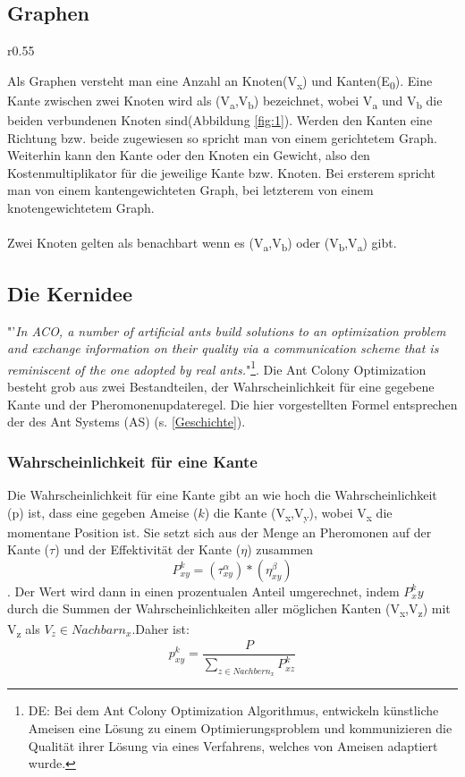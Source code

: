 \documentclass[12pt]{article}
\begin{document}
\subsection{Graphen}
\begin{wrapfigure}{r}{0.55\textwidth}
\centering
{}
\caption{Einfacher Graph}
\label{fig:1}
\end{wrapfigure}
Als Graphen versteht man eine Anzahl an Knoten(V\textsubscript{x}) und Kanten(E\textsubscript{0}). Eine Kante zwischen zwei Knoten wird als (V\textsubscript{a},V\textsubscript{b}) bezeichnet, wobei V\textsubscript{a} und V\textsubscript{b} die beiden verbundenen Knoten sind(Abbildung \ref{fig:1}). Werden den Kanten eine Richtung bzw. beide zugewiesen so spricht man von einem gerichtetem Graph. Weiterhin kann den Kante oder den Knoten ein Gewicht, also den Kostenmultiplikator für die jeweilige Kante bzw. Knoten. Bei ersterem spricht man von einem kantengewichteten Graph, bei letzterem von einem knotengewichtetem Graph.\\\\
Zwei Knoten gelten als benachbart wenn es (V\textsubscript{a},V\textsubscript{b}) oder (V\textsubscript{b},V\textsubscript{a}) gibt.
\subsection{Die Kernidee}\label{Kernidee}
"'\textit{In ACO, a number of artificial ants build solutions to an optimization problem and exchange information on their quality via a communication scheme that is reminiscent of the one adopted by real ants.}"\cite{ dorigo2007ant}\footnote{DE: Bei dem Ant Colony Optimization Algorithmus, entwickeln künstliche Ameisen eine Lösung zu einem Optimierungsproblem und kommunizieren die Qualität ihrer Lösung via eines Verfahrens, welches von Ameisen adaptiert wurde.  }. 
Die Ant Colony Optimization besteht grob aus zwei Bestandteilen, der Wahrscheinlichkeit für eine gegebene Kante und der Pheromonenupdateregel. Die hier vorgestellten Formel entsprechen der des Ant Systems (AS) (s. \ref{Geschichte}).
\subsubsection{Wahrscheinlichkeit für eine Kante}
Die Wahrscheinlichkeit für eine Kante gibt an wie hoch die Wahrscheinlichkeit (p) ist, dass eine gegeben Ameise ($k$) die Kante (V\textsubscript{x},V\textsubscript{y}), wobei V\textsubscript{x} die momentane Position ist. Sie setzt sich aus der Menge an Pheromonen auf der Kante ($\tau$) und der Effektivität der Kante ($\eta$) zusammen \[ P ^{ k }_{ xy }=\left(  \tau ^{ \alpha }_{ xy } \right)*\left(  \eta ^{ \beta }_{ xy } \right)\]. 
Der Wert wird dann in einen prozentualen Anteil umgerechnet, indem $P^k_xy$ durch die Summen der Wahrscheinlichkeiten aller möglichen Kanten (V\textsubscript{x},V\textsubscript{z}) mit V\textsubscript{z} als $V_z \in Nachbarn_{x}$.Daher ist: \[p^{k}_{xy}=\frac{P}{\sum_{z\in Nachbern_x}{}P^{k }_{xz}} \]
\end{document}
